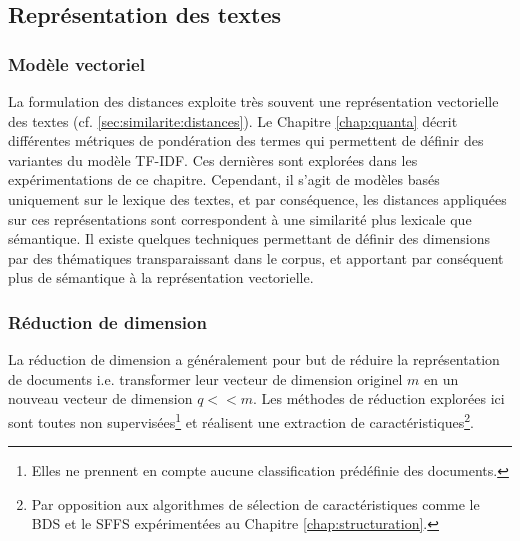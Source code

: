 


\subsection{Représentation des textes}
\label{sec:similarite:representation}
\subsubsection{Modèle vectoriel}
La formulation des distances exploite très souvent une représentation vectorielle des textes (cf.  \ref{sec:similarite:distances}). Le Chapitre \ref{chap:quanta} décrit différentes métriques de pondération des termes qui permettent de définir des variantes du modèle TF-IDF. Ces dernières sont explorées dans les expérimentations de ce chapitre. Cependant, il s'agit de modèles basés uniquement sur le lexique des textes, et par conséquence, les distances appliquées sur ces représentations sont correspondent à une similarité plus lexicale que sémantique. Il existe quelques techniques permettant de définir des dimensions par des thématiques transparaissant dans le corpus, et apportant par conséquent plus de sémantique à la représentation vectorielle.

\subsubsection{Réduction de dimension}
\label{sec:similarite:reduction-dimension}
La réduction de dimension a généralement pour but de réduire la représentation de documents i.e. transformer leur vecteur de dimension originel $m$ en un nouveau vecteur de dimension $q << m$. Les méthodes de réduction explorées ici sont toutes non supervisées\footnote{Elles ne prennent en compte aucune classification prédéfinie des documents.} et réalisent une extraction de caractéristiques\footnote{Par opposition aux algorithmes de sélection de caractéristiques comme le BDS et le SFFS expérimentées au Chapitre \ref{chap:structuration}.}. %


